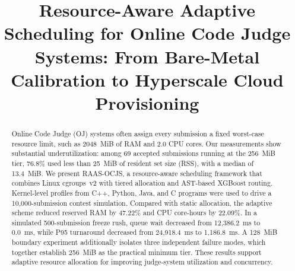 \documentclass[conference]{IEEEtran}
\begin{document}
\title{Resource-Aware Adaptive Scheduling for Online Code Judge Systems: From Bare-Metal Calibration to Hyperscale Cloud Provisioning}

\author{
\and
{}
\and
{}
\and
{}
\and
{}
}

\maketitle

\begin{abstract}
Online Code Judge (OJ) systems often assign every submission a fixed worst-case resource limit, such as 2048~MiB of RAM and 2.0 CPU cores. Our measurements show substantial underutilization: among 69 accepted submissions running at the 256~MiB tier, 76.8\% used less than 25~MiB of resident set size (RSS), with a median of 13.4~MiB. We present RAAS-OCJS, a resource-aware scheduling framework that combines Linux cgroups~v2 with tiered allocation and AST-based XGBoost routing. Kernel-level profiles from C++, Python, Java, and C programs were used to drive a 10,000-submission contest simulation. Compared with static allocation, the adaptive scheme reduced reserved RAM by 47.22\% and CPU core-hours by 22.09\%. In a simulated 500-submission freeze rush, queue wait decreased from 12,386.2~ms to 0.0~ms, while P95 turnaround decreased from 24,918.4~ms to 1,186.8~ms. A 128~MiB boundary experiment additionally isolates three independent failure modes, which together establish 256~MiB as the practical minimum tier. These results support adaptive resource allocation for improving judge-system utilization and concurrency.
\end{abstract}
\end{document}
